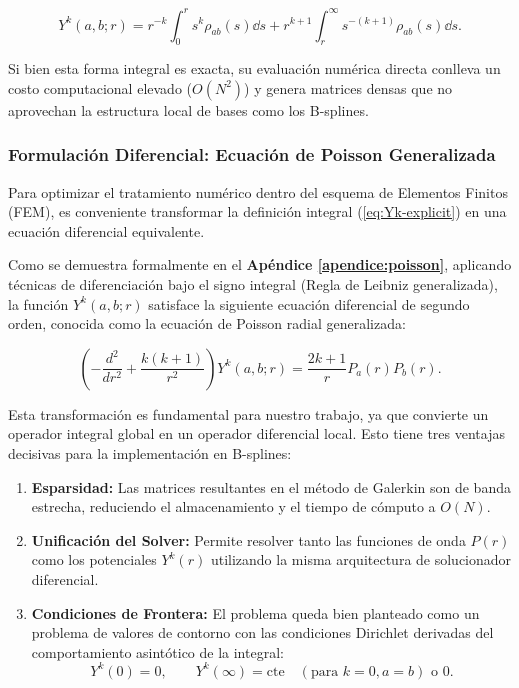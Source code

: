 \begin{equation}
\label{eq:Yk-explicit}
Y^k(a,b;r) = r^{-k}\int_0^r s^k \rho_{ab}(s) \dd{s} + r^{k+1} \int_r^{\infty} s^{-(k+1)} \rho_{ab}(s)\dd{s}.
\end{equation}

Si bien esta forma integral es exacta, su evaluación numérica directa conlleva un costo computacional elevado ($O(N^2)$) y genera matrices densas que no aprovechan la estructura local de bases como los B-splines.

\subsubsection{Formulación Diferencial: Ecuación de Poisson Generalizada}

Para optimizar el tratamiento numérico dentro del esquema de Elementos Finitos (FEM), es conveniente transformar la definición integral (\ref{eq:Yk-explicit}) en una ecuación diferencial equivalente.

Como se demuestra formalmente en el \textbf{Apéndice \cref{apendice:poisson}}, aplicando técnicas de diferenciación bajo el signo integral (Regla de Leibniz generalizada), la función $Y^k(a,b;r)$ satisface la siguiente ecuación diferencial de segundo orden, conocida como la ecuación de Poisson radial generalizada:

\begin{equation}
\label{eq:poisson-radial}
    \left( -\frac{d^2}{dr^2} + \frac{k(k+1)}{r^2} \right) Y^k(a,b;r) = \frac{2k+1}{r} P_a(r)P_b(r).
\end{equation}

Esta transformación es fundamental para nuestro trabajo, ya que convierte un operador integral global en un operador diferencial local. Esto tiene tres ventajas decisivas para la implementación en B-splines:

\begin{enumerate}
    \item \textbf{Esparsidad:} Las matrices resultantes en el método de Galerkin son de banda estrecha, reduciendo el almacenamiento y el tiempo de cómputo a $O(N)$.
    \item \textbf{Unificación del Solver:} Permite resolver tanto las funciones de onda $P(r)$ como los potenciales $Y^k(r)$ utilizando la misma arquitectura de solucionador diferencial.
    \item \textbf{Condiciones de Frontera:} El problema queda bien planteado como un problema de valores de contorno con las condiciones Dirichlet derivadas del comportamiento asintótico de la integral:
    \begin{equation}
        Y^k(0) = 0, \quad \quad Y^k(\infty) = \text{cte} \quad (\text{para } k=0, a=b) \text{ o } 0.
    \end{equation}
\end{enumerate}

